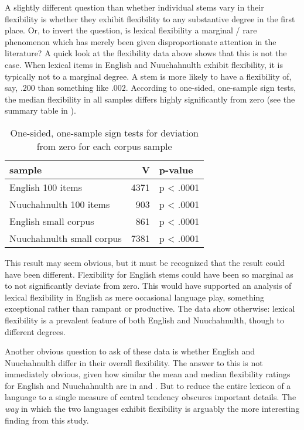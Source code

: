 A slightly different question than whether individual stems vary in their flexibility is whether they exhibit flexibility to any substantive degree in the first place. Or, to invert the question, is lexical flexibility a marginal / rare phenomenon which has merely been given disproportionate attention in the literature? A quick look at the flexibility data above shows that this is not the case. When lexical items in English and Nuuchahnulth exhibit flexibility, it is typically not to a marginal degree. A stem is more likely to have a flexibility of, say, $.200$ than something like $.002$. According to one-sided, one-sample sign tests, the median flexibility in all samples differs highly significantly from zero (see the summary table in ).

\begin{table}
  \centering
  \caption{One-sided, one-sample sign tests for deviation from zero for each corpus sample}
  \label{tab:English-vs-Nuuchahnulth-median}
  \begin{tabular}{ l r l }
    \toprule
    sample                    & V    & p-value\\
    \midrule
    English 100 items         & 4371 & p < .0001\\
    Nuuchahnulth 100 items    & 903  & p < .0001\\
    English small corpus      & 861  & p < .0001\\
    Nuuchahnulth small corpus & 7381 & p < .0001\\
    \bottomrule
  \end{tabular}
\end{table}

This result may seem obvious, but it must be recognized that the result could have been different. Flexibility for English stems could have been so marginal as to not significantly deviate from zero. This would have supported an analysis of lexical flexibility in English as mere occasional language play, something exceptional rather than rampant or productive. The data show otherwise: lexical flexibility is a prevalent feature of both English and Nuuchahnulth, though to different degrees.

Another obvious question to ask of these data is whether English and Nuuchahnulth differ in their overall flexibility. The answer to this is not immediately obvious, given how similar the mean and median flexibility ratings for English and Nuuchahnulth are in  and . But to reduce the entire lexicon of a language to a single measure of central tendency obscures important details. The \emph{way} in which the two languages exhibit flexibility is arguably the more interesting finding from this study.

